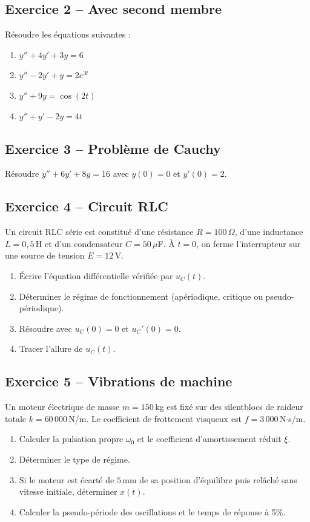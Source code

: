 \documentclass[a4paper,11pt]{article}
\begin{document}
\subsection*{Exercice 2 -- Avec second membre}
Résoudre les équations suivantes :
\begin{enumerate}[label=\alph*)]
  \item $y'' + 4y' + 3y = 6$
  \item $y'' - 2y' + y = 2e^{3t}$
  \item $y'' + 9y = \cos(2t)$
  \item $y'' + y' - 2y = 4t$
\end{enumerate}

\subsection*{Exercice 3 -- Problème de Cauchy}
Résoudre $y'' + 6y' + 8y = 16$ avec $y(0) = 0$ et $y'(0) = 2$.

\subsection*{Exercice 4 -- Circuit RLC}
Un circuit RLC série est constitué d'une résistance $R = 100\,\Omega$, d'une inductance $L = 0{,}5\,$H et d'un condensateur $C = 50\,\mu$F. À $t=0$, on ferme l'interrupteur sur une source de tension $E = 12\,$V.
\begin{enumerate}[label=\alph*)]
  \item Écrire l'équation différentielle vérifiée par $u_C(t)$.
  \item Déterminer le régime de fonctionnement (apériodique, critique ou pseudo-périodique).
  \item Résoudre avec $u_C(0) = 0$ et $u_C'(0) = 0$.
  \item Tracer l'allure de $u_C(t)$.
\end{enumerate}

\subsection*{Exercice 5 -- Vibrations de machine}
Un moteur électrique de masse $m = 150\,$kg est fixé sur des silentblocs de raideur totale $k = 60\,000\,$N/m. Le coefficient de frottement visqueux est $f = 3\,000\,$N$\cdot$s/m.
\begin{enumerate}[label=\alph*)]
  \item Calculer la pulsation propre $\omega_0$ et le coefficient d'amortissement réduit $\xi$.
  \item Déterminer le type de régime.
  \item Si le moteur est écarté de $5\,$mm de sa position d'équilibre puis relâché sans vitesse initiale, déterminer $x(t)$.
  \item Calculer la pseudo-période des oscillations et le temps de réponse à 5\%.
\end{enumerate}
\end{document}

